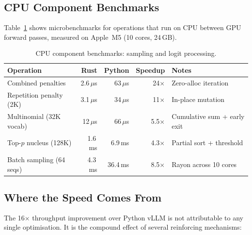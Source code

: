 \documentclass[11pt,a4paper]{article}
\newcommand{\thead}[1]{\textbf{#1}}
\begin{document}
\subsection{CPU Component Benchmarks}

Table~\ref{tab:cpu_bench} shows microbenchmarks for operations that run on CPU
between GPU forward passes, measured on Apple~M5 (10 cores, 24\,GB).

\begin{table}[t]
  \centering
  \caption{CPU component benchmarks: sampling and logit processing.}
  \label{tab:cpu_bench}
  \small
  \begin{tabular}{@{}lrrrp{3.2cm}@{}}
    \toprule
    \rowcolor{HeaderBlue} \thead{Operation} & \thead{Rust} & \thead{Python} & \thead{Speedup} & \thead{Notes} \\
    \midrule
    Combined penalties      & 2.6\,$\mu$s  & 63\,$\mu$s  & 24$\times$  & Zero-alloc iteration \\
    \rowcolor{gray!8}
    Repetition penalty (2K) & 3.1\,$\mu$s  & 34\,$\mu$s  & 11$\times$  & In-place mutation \\
    Multinomial (32K vocab)  & 12\,$\mu$s   & 66\,$\mu$s  & 5.5$\times$ & Cumulative sum + early exit \\
    \rowcolor{gray!8}
    Top-$p$ nucleus (128K)  & 1.6\,ms      & 6.9\,ms     & 4.3$\times$ & Partial sort + threshold \\
    Batch sampling (64 seqs) & 4.3\,ms     & 36.4\,ms    & 8.5$\times$ & Rayon across 10 cores \\
    \bottomrule
  \end{tabular}
\end{table}

\subsection{Where the Speed Comes From}

The 16$\times$ throughput improvement over Python vLLM is not attributable to any
single optimisation. It is the compound effect of several reinforcing mechanisms:
\end{document}
